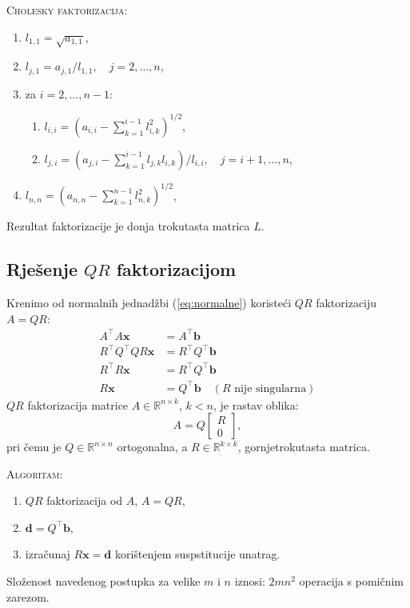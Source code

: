 \documentclass{article}
\begin{document}
\textsc{Cholesky faktorizacija:}
\begin{enumerate}[\indent 1)]
  \item $l_{1,1} = \sqrt{a_{1,1}}$,
  \item $l_{j,1} = a_{j,1}/l_{1,1},\quad j = 2, \ldots, n$,
  \item za $i = 2, \ldots, n-1$:
  \begin{enumerate}[\indent a)]
    \item $l_{i,i} = \left (a_{i,i} - \sum\limits_{k=1}^{i-1} l_{i,k}^2\right )^{1/2}$,
    \item $l_{j,i} = \left (a_{j,i} - \sum\limits_{k=1}^{i-1} l_{j,k}l_{i,k}\right )/l_{i,i},\quad j = i+1, \ldots, n$,
  \end{enumerate}
  \item $l_{n,n} = \left ( a_{n,n} - \sum\limits_{k=1}^{n-1} l_{n,k}^2\right ) ^{1/2}$,
\end{enumerate}
Rezultat faktorizacije je donja trokutasta matrica $L$.

\subsection{Rješenje $QR$ faktorizacijom}
Krenimo od normalnih jednadžbi (\ref{eq:normalne}) koristeći $QR$ faktorizaciju $A = QR$:
\begin{align}
A^\top A \mathbf x &= A^\top \mathbf b \nonumber \\
R^\top Q^\top Q R\mathbf x &= R^\top Q^\top\mathbf b  \nonumber \\
R^\top R\mathbf x &= R^\top Q^\top\mathbf b  \nonumber \\
 R\mathbf x &= Q^\top\mathbf b\quad (R \text{ nije singularna})\nonumber 
\end{align}
$QR$ faktorizacija matrice $A \in \mathbb R^{n \times k}$, $k<n$, je rastav oblika:
$$A = Q \begin{bmatrix}R\\0\end{bmatrix},$$
pri čemu je $Q \in \mathbb R^{n \times n}$ ortogonalna, a $R \in \mathbb R^{k\times k}$, gornjetrokutasta matrica.

\textsc{Algoritam:}
\begin{enumerate}[\indent 1)]
  \item $QR$ faktorizacija od $A$, $A = QR$,
  \item $\mathbf d = Q^\top \mathbf b$,
  \item izračunaj $R \mathbf x = \mathbf d$ korištenjem suspstitucije unatrag.
\end{enumerate}
Složenost navedenog postupka za velike $m$ i $n$ iznosi: $2mn^2$ operacija s pomičnim zarezom. 
\end{document}
